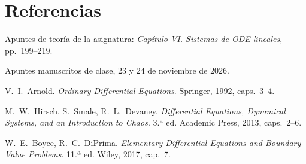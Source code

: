 \documentclass[11pt,twoside]{article}
\begin{document}
\section*{Referencias}
{\small
\begin{enumerate}[label={[\arabic*]},leftmargin=2em,itemsep=1pt]
\item Apuntes de teoría de la asignatura: \emph{Capítulo VI. Sistemas de ODE lineales}, pp.~199--219.
\item Apuntes manuscritos de clase, 23 y 24 de noviembre de 2026.
\item V.~I.~Arnold. \emph{Ordinary Differential Equations}. Springer, 1992, caps.~3--4.
\item M.~W.~Hirsch, S.~Smale, R.~L.~Devaney. \emph{Differential Equations, Dynamical Systems, and an Introduction to
Chaos}. 3.ª ed. Academic Press, 2013, caps.~2--6.
\item W.~E.~Boyce, R.~C.~DiPrima. \emph{Elementary Differential Equations and Boundary Value Problems}. 11.ª ed.
Wiley, 2017, cap.~7.
\end{enumerate}}
\end{document}
